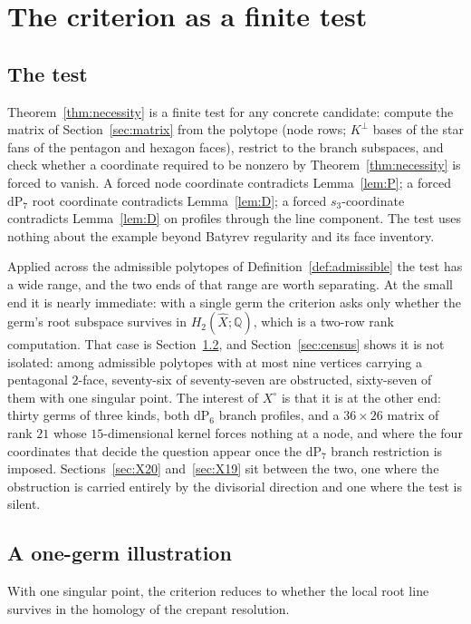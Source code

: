 \documentclass[11pt]{amsart}
\theoremstyle{definition}
\theoremstyle{remark}
\theoremstyle{plain}
\newcommand{\QQ}{\mathbb{Q}}
\newcommand{\dP}{\mathrm{dP}}
\newcommand{\Xh}{\widehat{X}}
\begin{document}
\section{The criterion as a finite test}
\label{sec:test}

\subsection{The test}\label{sec:thetest}
Theorem~\ref{thm:necessity} is a finite test for any concrete
candidate: compute the matrix of Section~\ref{sec:matrix} from the
polytope (node rows; $K^{\perp}$ bases of the star fans of
the pentagon and hexagon faces), restrict to the branch subspaces,
and check whether a coordinate required to be nonzero by
Theorem~\ref{thm:necessity} is forced to vanish.  A
forced node coordinate contradicts Lemma~\ref{lem:P}; a forced
$\dP_7$ root coordinate contradicts Lemma~\ref{lem:D}; a forced
$s_3$-coordinate contradicts Lemma~\ref{lem:D} on profiles through
the line component.  The test uses nothing about the example beyond Batyrev regularity and its face inventory.

Applied across the admissible polytopes of
Definition~\ref{def:admissible} the test has a wide range, and the two
ends of that range are worth separating.  At the small end it is nearly immediate: with a single germ the criterion
asks only whether the germ's root subspace survives in $H_2(\Xh;\QQ)$, which
is a two-row rank computation.  That case is
Section~\ref{sec:onegerm}, and Section~\ref{sec:census} shows it is not
isolated: among admissible polytopes with at most nine vertices
carrying a pentagonal $2$-face, seventy-six of seventy-seven are
obstructed, sixty-seven of them with one singular point.  The interest
of $X^{\circ}$ is that it is at the other end: thirty germs of three
kinds, both $\dP_6$ branch profiles, and a $36\times26$ matrix of rank
$21$ whose $15$-dimensional kernel forces nothing at a node, and where the
four coordinates that decide the question appear once the $\dP_7$ branch
restriction is imposed.  Sections~\ref{sec:X20} and~\ref{sec:X19}
sit between the two, one where the obstruction is carried entirely by
the divisorial direction and one where the test is silent.

\subsection{A one-germ illustration}\label{sec:onegerm}
With one singular point, the criterion reduces to whether the local root line
survives in the homology of the crepant resolution.
\end{document}
